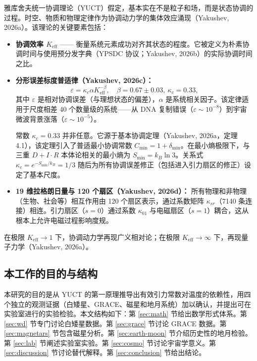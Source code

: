 \documentclass[12pt]{article}
\theoremstyle{remark}
\newcommand{\Keff}{K_{\mathrm{eff}}}
\newcommand{\eps}{\varepsilon}
\newcommand{\kappac}{\kappa_c}
\newcommand{\constmin}{C_{\min}}
\newcommand{\dint}{\ensuremath{D\!+\!I\!\cdot\!R}}
\begin{document}
	雅库舍夫统一协调理论（YUCT）假定，基本实在不是粒子和场，而是状态协调的过程。时空、物质和物理定律作为协调动力学的集体效应涌现（Yakushev, 2026a）。该理论的关键要素包括：
	\begin{itemize}
		\item \textbf{协调效率 $\Keff$} —— 衡量系统元素成功对齐其状态的程度。它被定义为朴素协调时间与使用预分发字典（YPSDC 协议；Yakushev, 2026b）的实际协调时间之比。
		\item \textbf{分形误差标度普适律（Yakushev, 2026c）：}
		\begin{equation}
			\eps = \kappac \alpha \Keff^{-\beta}, \quad \beta = 0.67 \pm 0.03, \ \kappac = 0.33,
			\label{eq:universal-scaling}
		\end{equation}
		其中 $\eps$ 是相对协调误差（与理想状态的偏差），$\alpha$ 是系统相关因子。该定律适用于尺度相差 40 个数量级的系统——从 DNA 复制错误（$\eps\sim 10^{-8}$）到宇宙微波背景涨落（$\eps\sim 10^{-5}$）。
		
		常数 $\kappac = 0.33$ 并非任意。它源于基本协调定理（Yakushev, 2026a，定理 4.1），该定理引入了普适最小协调常数 $\constmin = 1 + \delta_{\min}$。在最小熵极限下，与三重 $\dint$ 本体论相关的最小熵为 $S_{\min} = k_B \ln 3$。关系式 $\kappac = e^{-S_{\min}/k_B} = 1/3$ 随后为所有协调误差修正（包括进入引力扇区的修正）设定了基本尺度。
		
		\item \textbf{19 维拉格朗日量与 120 个扇区（Yakushev, 2026d）：} 所有物理和非物理（生物、社会等）相互作用由 120 个扇区表示，通过系数矩阵 $\kappa_{sr}$（7140 条连接）相连。引力扇区（$s=0$）通过系数 $\kappa_{01}$ 与电磁扇区（$s=1$）耦合，这从根本上允许电磁过程影响度规。
	\end{itemize}
	在极限 $\Keff \to 1$ 下，协调动力学再现广义相对论；在极限 $\Keff \to \infty$ 下，再现量子力学（Yakushev, 2026a）。
	
	\subsection{本工作的目的与结构}
	\label{subsec:purpose}
	
	本研究的目的是从 YUCT 的第一原理推导出有效引力常数对温度的依赖性，用四个独立的观测证据（白矮星、GRACE、磁星和地月系统）加以确认，并提出可在实验室进行的实验检验。本文结构如下：第 \ref{sec:math} 节给出数学形式体系。第 \ref{sec:wd} 节专门讨论白矮星数据。第 \ref{sec:grace} 节讨论 GRACE 数据。第 \ref{sec:magnetars} 节包含磁星分析。第 \ref{sec:earth-moon} 节介绍历史性的地月检验。第 \ref{sec:lab} 节阐述实验室实验。第 \ref{sec:cosmo} 节讨论宇宙学意义。第 \ref{sec:discussion} 节讨论替代解释。第 \ref{sec:conclusion} 节给出结论。
	
\end{document}
